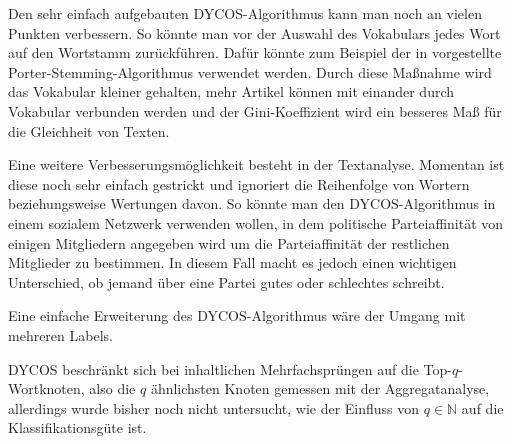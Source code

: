 Den sehr einfach aufgebauten DYCOS-Algorithmus kann man noch an
vielen Punkten verbessern. So könnte man vor der Auswahl des
Vokabulars jedes Wort auf den Wortstamm zurückführen.
Dafür könnte zum Beispiel der in \cite{porter} vorgestellte 
Porter-Stemming-Algorithmus verwendet werden. Durch diese Maßnahme wird das
Vokabular kleiner gehalten, mehr Artikel können mit einander
durch Vokabular verbunden werden und der Gini-Koeffizient wird ein
besseres Maß für die Gleichheit von Texten.

Eine weitere Verbesserungsmöglichkeit besteht in der Textanalyse.
Momentan ist diese noch sehr einfach gestrickt und ignoriert die
Reihenfolge von Wortern beziehungsweise Wertungen davon. So könnte
man den DYCOS-Algorithmus in einem sozialem Netzwerk verwenden wollen,
in dem politische Parteiaffinität von einigen Mitgliedern angegeben
wird um die Parteiaffinität der restlichen Mitglieder zu bestimmen.
In diesem Fall macht es jedoch einen wichtigen Unterschied, ob jemand
über eine Partei gutes oder schlechtes schreibt.

Eine einfache Erweiterung des DYCOS-Algorithmus wäre der Umgang mit 
mehreren Labels.

DYCOS beschränkt sich bei inhaltlichen Mehrfachsprüngen
auf die Top-$q$-Wortknoten, also die $q$ ähnlichsten Knoten
gemessen mit der Aggregatanalyse, allerdings wurde bisher noch nicht
untersucht, wie der Einfluss von $q \in \mathbb{N}$ auf die 
Klassifikationsgüte ist.
